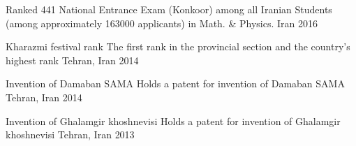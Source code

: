 



\begin{cvhonors}

  \cvhonor
    {Ranked 441} %
    {National Entrance Exam (Konkoor) among all Iranian Students (among approximately 163000 applicants) in Math. \& Physics.} %
    {Iran} %
    {2016} %

  \cvhonor
    {Kharazmi festival rank} %
    {The first rank in the provincial section and the country’s highest rank} %
    {Tehran, Iran} %
    {2014} %

  \cvhonor
    {Invention of Damaban SAMA} %
    {Holds a patent for invention of Damaban SAMA} %
    {Tehran, Iran} %
    {2014} %

  \cvhonor
    {Invention of Ghalamgir khoshnevisi} %
    {Holds a patent for invention of Ghalamgir khoshnevisi} %
    {Tehran, Iran} %
    {2013} %

\end{cvhonors}








